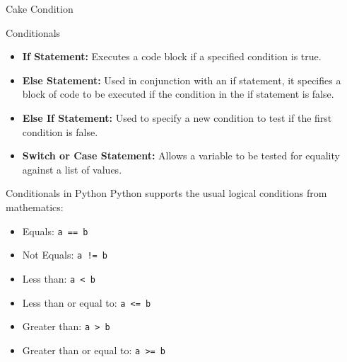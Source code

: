 \documentclass[10pt]{beamer}
\begin{document}
\begin{frame}{Cake Condition}
\begin{center}
\end{center}

\end{frame}


\begin{frame}{Conditionals}
\begin{itemize}
\item \textbf{If Statement:} Executes a code block if a specified condition is true.
\item \textbf{Else Statement:} Used in conjunction with an if statement, it specifies a block of code to be executed if the condition in the if statement is false.
\item \textbf{Else If Statement:} Used to specify a new condition to test if the first condition is false.
\item \textbf{Switch or Case Statement:} Allows a variable to be tested for equality against a list of values.
\end{itemize}
\end{frame}


\begin{frame}{Conditionals in Python}
Python supports the usual logical conditions from mathematics:
\begin{itemize}
\item Equals: \texttt{a == b}
\item Not Equals: \texttt{a != b}
\item Less than: \texttt{a < b}
\item Less than or equal to: \texttt{a <= b}
\item Greater than: \texttt{a > b}
\item Greater than or equal to: \texttt{a >= b}
\end{itemize}
\end{frame}
\end{document}
